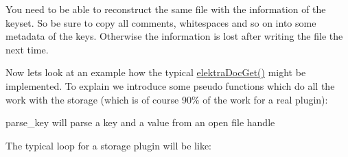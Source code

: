 You need to be able to reconstruct the same file with the information of the keyset. So be sure to copy all comments, whitespaces and so on into some metadata of the keys. Otherwise the information is lost after writing the file the next time.

Now lets look at an example how the typical \mbox{\hyperlink{group__plugin_gacb69f3441c6d84241b4362f958fbe313}{elektra\+Doc\+Get()}} might be implemented. To explain we introduce some pseudo functions which do all the work with the storage (which is of course 90\% of the work for a real plugin)\+:
\begin{DoxyItemize}
\item parse\+\_\+key will parse a key and a value from an open file handle
\end{DoxyItemize}

The typical loop for a storage plugin will be like\+:


